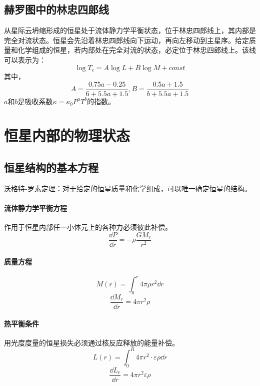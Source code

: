 \subsection{赫罗图中的林忠四郎线}
从星际云坍缩形成的恒星处于流体静力学平衡状态，位于林忠四郎线上，其内部是完全对流状态。恒星会先沿着林忠四郎线向下运动，再向左移动到主星序。给定质量和化学组成的恒星，若内部处在完全对流的状态，必定位于林忠四郎线上。该线可以表示为：
\begin{equation}
	\log T_{e}=A\log L+B\log M+const
\end{equation}
其中，\begin{equation}
	A=\frac{0.75a-0.25}{6+5.5a+1.5},B=\frac{0.5a+1.5}{b+5.5a+1.5}
\end{equation}
$a$和$b$是吸收系数$\kappa=\kappa_{0}P^aT^b$的指数。
\section{恒星内部的物理状态}
\subsection{恒星结构的基本方程}
沃格特-罗素定理：对于给定的恒星质量和化学组成，可以唯一确定恒星的结构。
\paragraph{流体静力学平衡方程}作用于恒星内部任一小体元上的各种力必须彼此补偿。
\begin{equation}
	\frac{\dd P}{\dd r}=-\rho\frac{GM_{r}}{r^2}
\end{equation}
\paragraph{质量方程}
\begin{equation}
	M(r)=\int_{0}^{r}4\pi\rho r^2\dd r
\end{equation}
\begin{equation}
	\frac{\dd M_{r}}{\dd r}=4\pi r^2\rho
\end{equation}
\paragraph{热平衡条件}用光度度量的恒星损失必须通过核反应释放的能量补偿。
\begin{equation}
	L(r)=\int_{0}^{R}4\pi r^2\cdot \varepsilon\rho \dd r
\end{equation}
\begin{equation}
	\frac{\dd L_{r}}{\dd r}=4\pi r^2\varepsilon\rho
\end{equation}
